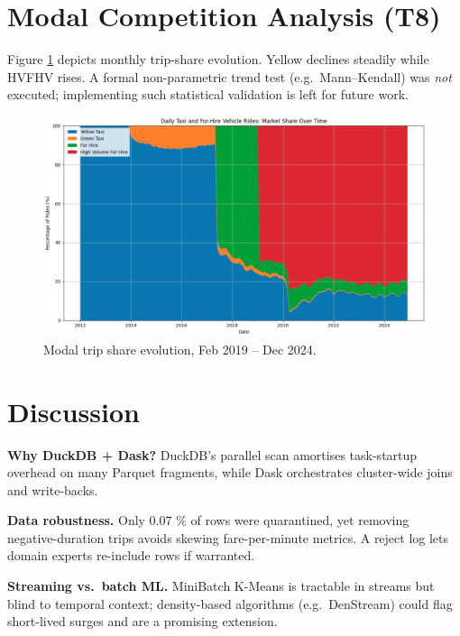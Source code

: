 \documentclass[conference]{IEEEtran}
\begin{document}

\section{Modal Competition Analysis (T8)}\label{sec:impact}
Figure \ref{fig:mode-evolution} depicts monthly trip-share evolution.
Yellow declines steadily while HVFHV rises.  
A formal non-parametric trend test (e.g.\ Mann–Kendall) was \emph{not}
executed; implementing such statistical validation is left for future
work.

\begin{figure}[htbp]
  \centering
  \includegraphics[width=0.88\linewidth]{mode_evolution.png}
  \caption{Modal trip share evolution, Feb 2019 – Dec 2024.}
  \label{fig:mode-evolution}
\end{figure}

\section{Discussion}\label{sec:discussion}
\textbf{Why DuckDB + Dask?}  
DuckDB’s parallel scan amortises task-startup overhead on many Parquet
fragments, while Dask orchestrates cluster-wide joins and write-backs.

\textbf{Data robustness.}  
Only 0.07 \% of rows were quarantined, yet removing
negative-duration trips avoids skewing fare-per-minute metrics.  A
reject log lets domain experts re-include rows if warranted.

\textbf{Streaming vs.\ batch ML.}  
MiniBatch K-Means is tractable in streams but blind to temporal
context; density-based algorithms (e.g.\ DenStream) could flag
short-lived surges and are a promising extension.
\end{document}
